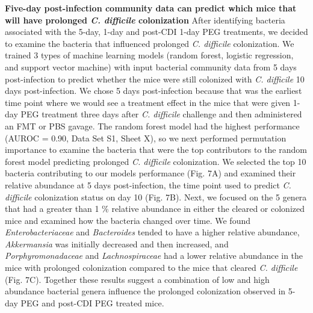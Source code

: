 \documentclass[
  11pt,
]{article}
\begin{document}
\textbf{Five-day post-infection community data can predict which mice
that will have prolonged \emph{C. difficile} colonization} After
identifying bacteria associated with the 5-day, 1-day and post-CDI 1-day
PEG treatments, we decided to examine the bacteria that influenced
prolonged \emph{C. difficile} colonization. We trained 3 types of
machine learning models (random forest, logistic regression, and support
vector machine) with input bacterial community data from 5 days
post-infection to predict whether the mice were still colonized with
\emph{C. difficile} 10 days post-infection. We chose 5 days
post-infection because that was the earliest time point where we would
see a treatment effect in the mice that were given 1-day PEG treatment
three days after \emph{C. difficile} challenge and then administered an
FMT or PBS gavage. The random forest model had the highest performance
(AUROC = 0.90, Data Set S1, Sheet X), so we next performed permutation
importance to examine the bacteria that were the top contributors to the
random forest model predicting prolonged \emph{C. difficile
}colonization. We selected the top 10 bacteria contributing to our
models performance (Fig. 7A) and examined their relative abundance at 5
days post-infection, the time point used to predict \emph{C. difficile}
colonization status on day 10 (Fig. 7B). Next, we focused on the 5
genera that had a greater than 1 \% relative abundance in either the
cleared or colonized mice and examined how the bacteria changed over
time. We found \emph{Enterobacteriaceae} and \emph{Bacteroides} tended
to have a higher relative abundance, \emph{Akkermansia} was initially
decreased and then increased, and \emph{Porphyromonadaceae} and
\emph{Lachnospiraceae} had a lower relative abundance in the mice with
prolonged colonization compared to the mice that cleared \emph{C.
difficile} (Fig. 7C). Together these results suggest a combination of
low and high abundance bacterial genera influence the prolonged
colonization observed in 5-day PEG and post-CDI PEG treated mice.
\end{document}
